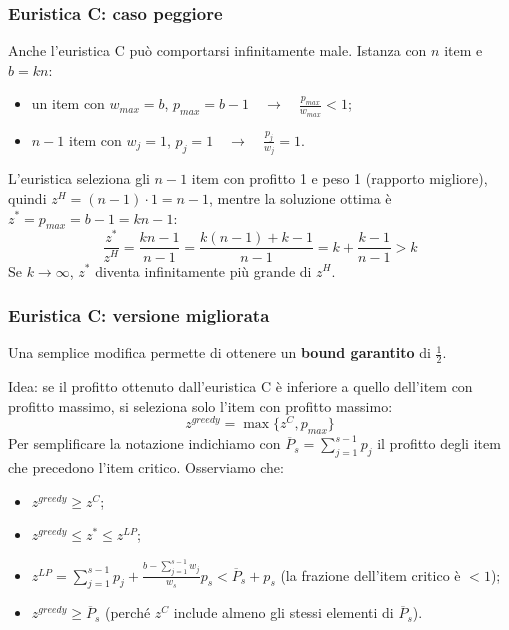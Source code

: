 \subsubsection*{Euristica C: caso peggiore}
Anche l'euristica C può comportarsi infinitamente male. Istanza con $n$ item e $b=kn$:
\begin{itemize}
	\item un item con $w_{max}=b$, $p_{max}=b-1\quad \rightarrow \quad \frac{p_{max}}{w_{max}}<1$;
	\item $n-1$ item con $w_j=1$, $p_j=1\quad \rightarrow \quad \frac{p_j}{w_j}=1$.
\end{itemize}
L'euristica seleziona gli $n-1$ item con profitto 1 e peso 1 (rapporto migliore), quindi $z^H=(n-1)\cdot 1=n-1$, mentre la soluzione ottima è $z^*=p_{max}=b-1=kn-1$:
\begin{equation*}
	\frac{z^*}{z^H}=\frac{kn-1}{n-1}=\frac{k(n-1)+k-1}{n-1}=k+\frac{k-1}{n-1}>k
\end{equation*}
Se $k\to \infty$, $z^*$ diventa infinitamente più grande di $z^H$.

\subsubsection*{Euristica C: versione migliorata}
Una semplice modifica permette di ottenere un \textbf{bound garantito} di $\frac{1}{2}$.

Idea: se il profitto ottenuto dall'euristica C è inferiore a quello dell'item con profitto massimo, si seleziona solo l'item con profitto massimo:
\begin{equation*}
	z^{greedy}=\max\{z^C,p_{max}\}
\end{equation*}
Per semplificare la notazione indichiamo con $\overline{P}_s=\sum_{j=1}^{s-1}p_j$ il profitto degli item che precedono l'item critico. Osserviamo che:
\begin{itemize}
	\item $z^{greedy}\ge z^C$;
	\item $z^{greedy}\le z^*\le z^{LP}$;
	\item $z^{LP}=\sum_{j=1}^{s-1}p_j+\frac{b-\sum_{j=1}^{s-1}w_j}{w_s}p_s<\overline{P}_s+p_s$ (la frazione dell'item critico è $<1$);
	\item $z^{greedy}\ge \overline{P}_s$ (perché $z^C$ include almeno gli stessi elementi di $\overline{P}_s$).
\end{itemize}

